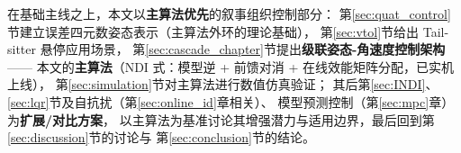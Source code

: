 在基础主线之上，本文以\textbf{主算法优先}的叙事组织控制部分：
第\ref{sec:quat_control}节建立误差四元数姿态表示（主算法外环的理论基础），
第\ref{sec:vtol}节给出 Tail-sitter 悬停应用场景，
第\ref{sec:cascade_chapter}节提出\textbf{级联姿态-角速度控制架构}——
本文的\textbf{主算法}（NDI 式：模型逆 + 前馈对消 + 在线效能矩阵分配，已实机上线），
第\ref{sec:simulation}节对主算法进行数值仿真验证；
其后第\ref{sec:INDI}、\ref{sec:lqr}节及自抗扰（第\ref{sec:online_id}章相关）、
模型预测控制（第\ref{sec:mpc}章）为\textbf{扩展/对比方案}，
以主算法为基准讨论其增强潜力与适用边界，最后回到第\ref{sec:discussion}节的讨论与
第\ref{sec:conclusion}节的结论。
